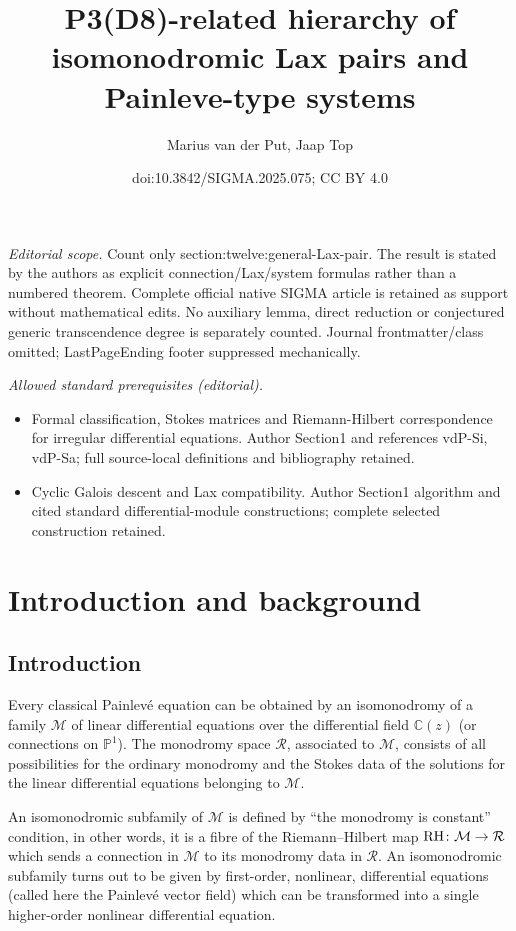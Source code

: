 \documentclass[10pt,a4paper]{amsart}
\title{P3(D8)-related hierarchy of isomonodromic Lax pairs and Painleve-type systems}
\author{Marius van der Put, Jaap Top}
\date{doi:10.3842/SIGMA.2025.075; CC BY 4.0}
\numberwithin{equation}{section}
\begin{document}
\maketitle
\noindent\textit{Editorial scope.} Count only section:twelve:general-Lax-pair. The result is stated by the authors as explicit connection/Lax/system formulas rather than a numbered theorem. Complete official native SIGMA article is retained as support without mathematical edits. No auxiliary lemma, direct reduction or conjectured generic transcendence degree is separately counted. Journal frontmatter/class omitted; LastPageEnding footer suppressed mechanically.\par\medskip
\noindent\textit{Allowed standard prerequisites (editorial).}\begin{itemize}
\item Formal classification, Stokes matrices and Riemann-Hilbert correspondence for irregular differential equations. Author Section1 and references vdP-Si, vdP-Sa; full source-local definitions and bibliography retained.
\item Cyclic Galois descent and Lax compatibility. Author Section1 algorithm and cited standard differential-module constructions; complete selected construction retained.
\end{itemize}\medskip
 \section{Introduction and background}\label{section0}

\subsection{Introduction}\label{FlNe}
Every classical Painlev\'e equation can be obtained by an isomonodromy of a family $\mathcal{M}$ of linear differential equations over the differential field $\mathbb{C}(z)$ \big(or connections on $\mathbb{P}^1$\big). The monodromy space $\mathcal{R}$, associated to $\mathcal{M}$, consists of all possibilities for the ordinary monodromy and the Stokes data of the solutions for the linear differential equations
belonging to $\mathcal{M}$.

An isomonodromic subfamily of $\mathcal{M}$ is defined by ``the monodromy is constant'' condition, in other words, it is
a fibre of the Riemann--Hilbert map ${\rm RH}\colon \mathcal{M}\rightarrow \mathcal{R}$ which sends a connection in $\mathcal{M}$
to its monodromy data in $\mathcal{R}$.
An isomonodromic subfamily turns out to be given by first-order, nonlinear, differential equations
(called here the Painlev\'e vector field) which can be transformed into a single higher-order nonlinear differential equation.
\end{document}
